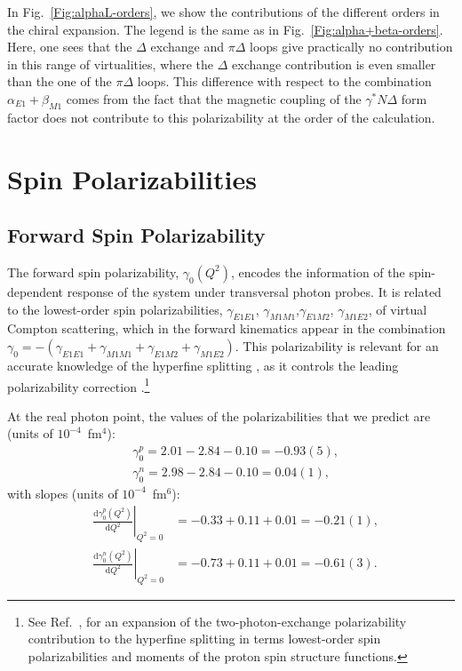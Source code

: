 \documentclass[twocolumn,prc,showpacs,nofootinbib,preprintnumbers,amsmath,amssymb,superscriptaddress]{revtex4-1}
\def\dd{\mathrm{d}}
\begin{document}
In Fig.~\ref{Fig:alphaL-orders}, we show the contributions of the different orders in the chiral expansion. 
The legend is the same as in Fig.~\ref{Fig:alpha+beta-orders}. 
Here, one sees that the $\Delta$ exchange and $\pi \Delta$ loops give practically no contribution in this range of virtualities, where the $\Delta$ exchange contribution is even smaller than the one of the $\pi \Delta$ loops. 
This difference with respect to the combination $\alpha_{E1}+\beta_{M1}$ comes from the fact that the magnetic coupling of the $\gamma^* N \Delta$ form factor does not contribute to this polarizability at the order of the calculation.







\section{Spin Polarizabilities}
\label{Sec:Spin-Pol}

\subsection{Forward Spin Polarizability}
\label{Sec:ForwardSpinPolarizability}

The forward spin polarizability, $\gamma_0(Q^2)$, encodes the information of the spin-dependent response of the system under transversal photon probes. 
It is related to the lowest-order spin polarizabilities, $\gamma_{E1E1}$, $\gamma_{M1M1}$,$\gamma_{E1M2}$, $\gamma_{M1E2}$, of virtual Compton scattering, which in the forward kinematics appear in the combination $\gamma_0=-(\gamma_{E1E1} + \gamma_{M1M1} + \gamma_{E1M2}+\gamma_{M1E2})$. 
This polarizability is relevant for an accurate knowledge of the hyperfine splitting \cite{Hagelstein:2015egb,Hagelstein:2015lph}, as it controls the leading polarizability correction \cite{Carlson:2008ke}.\footnote{See Ref.~\cite{Hagelstein:2017cbl}, for an expansion of the two-photon-exchange polarizability contribution to the hyperfine splitting in terms lowest-order spin polarizabilities and moments of the proton spin structure functions.} 


At the real photon point, the values of the polarizabilities that we predict are (units of $10^{-4}$~fm$^4$):
\begin{align}
&\gamma^p_0 = 2.01 - 2.84 -0.10=-0.93(5), \label{Eq:gamma0ProtonRealPoint}\\
&\gamma^n_0 = 2.98 - 2.84-0.10  = 0.04(1),
\end{align}
with slopes (units of $10^{-4}$~fm$^6$):
\begin{align}
&\left.\frac{\dd\gamma_0^p (Q^2)}{\dd Q^2}\right|_{Q^2=0}&=  -0.33  +0.11 +0.01 = -0.21(1),  \\
&\left.\frac{\dd\gamma_0^n (Q^2)}{\dd Q^2}\right|_{Q^2=0}&=  -0.73 +0.11 +0.01 =-0.61(3).
\end{align}
\end{document}
